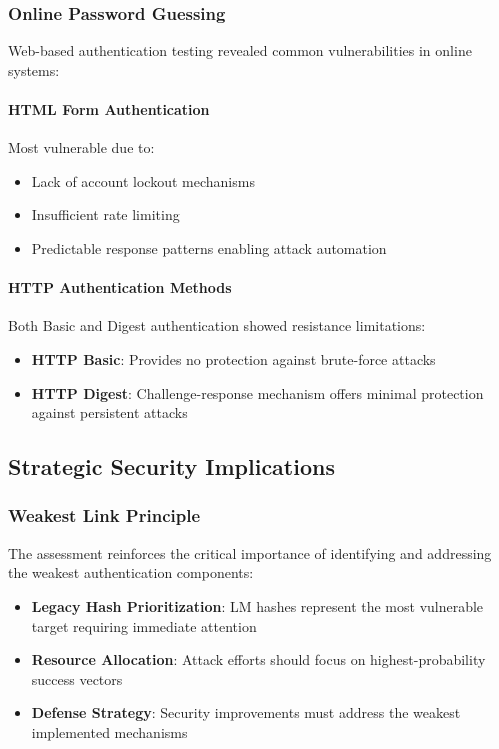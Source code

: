 {\subsubsection{Online Password Guessing}

Web-based authentication testing revealed common vulnerabilities in online systems:

\paragraph{HTML Form Authentication}
Most vulnerable due to:
\begin{itemize}
    \item Lack of account lockout mechanisms
    \item Insufficient rate limiting
    \item Predictable response patterns enabling attack automation
\end{itemize}

\paragraph{HTTP Authentication Methods}
Both Basic and Digest authentication showed resistance limitations:
\begin{itemize}
    \item \textbf{HTTP Basic}: Provides no protection against brute-force attacks
    \item \textbf{HTTP Digest}: Challenge-response mechanism offers minimal protection against persistent attacks
\end{itemize}

\subsection{Strategic Security Implications}

\subsubsection{Weakest Link Principle}

The assessment reinforces the critical importance of identifying and addressing the weakest authentication components:

\begin{itemize}
    \item \textbf{Legacy Hash Prioritization}: LM hashes represent the most vulnerable target requiring immediate attention
    \item \textbf{Resource Allocation}: Attack efforts should focus on highest-probability success vectors
    \item \textbf{Defense Strategy}: Security improvements must address the weakest implemented mechanisms
\end{itemize}

}
